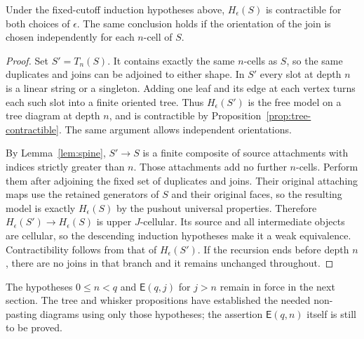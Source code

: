 \begin{proposition}
\label{prop:whiskered-shape}
Under the fixed-cutoff induction hypotheses above,
$H_\epsilon(S)$ is contractible for both choices of $\epsilon$.
The same conclusion holds if the orientation of the join is
chosen independently for each $n$-cell of $S$.
\end{proposition}

\begin{proof}
Set $S'=T_n(S)$.  It contains exactly the same $n$-cells as $S$,
so the same duplicates and joins can be adjoined to either
shape.  In $S'$ every slot at depth $n$ is a linear string or a
singleton.  Adding one leaf and its edge at each vertex turns
each such slot into a finite oriented tree.  Thus
$H_\epsilon(S')$ is the free model on a tree diagram at depth
$n$, and is contractible by
Proposition~\ref{prop:tree-contractible}.  The same argument
allows independent orientations.

By Lemma~\ref{lem:spine}, $S'\to S$ is a finite composite of
source attachments with indices strictly greater than $n$.
Those attachments add no further $n$-cells.  Perform them after
adjoining the fixed set of duplicates and joins.  Their original
attaching maps use the retained generators of $S$ and their
original faces, so the resulting model is exactly
$H_\epsilon(S)$ by the pushout universal properties.  Therefore
$H_\epsilon(S')\to H_\epsilon(S)$ is upper $J$-cellular.  Its
source and all intermediate objects are cellular, so the
descending induction hypotheses make it a weak equivalence.
Contractibility follows from that of $H_\epsilon(S')$.
If the recursion ends before depth $n$, there are no joins in
that branch and it remains unchanged throughout.
\end{proof}

The hypotheses $0\leq n<q$ and $\mathsf E(q,j)$ for $j>n$
remain in force in the next section.  The tree and whisker
propositions have established the needed non-pasting diagrams
using only those hypotheses; the assertion $\mathsf E(q,n)$
itself is still to be proved.
